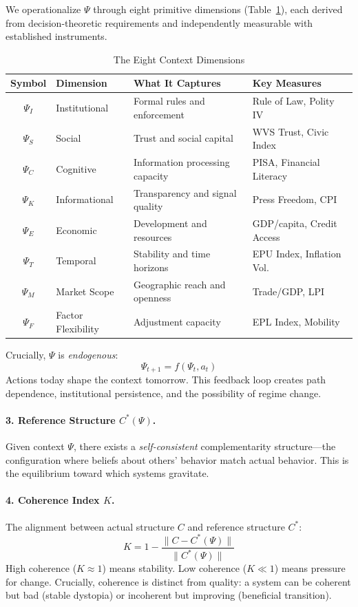 \documentclass[12pt,a4paper]{article}
\begin{document}
We operationalize $\Psi$ through eight primitive dimensions (Table~\ref{tab:psi-intro}), each derived from decision-theoretic requirements and independently measurable with established instruments.

\begin{table}[htbp]
\centering
\caption{The Eight Context Dimensions}
\label{tab:psi-intro}
\small
\begin{tabular}{@{}clll@{}}
\toprule
\textbf{Symbol} & \textbf{Dimension} & \textbf{What It Captures} & \textbf{Key Measures} \\
\midrule
$\Psi_I$ & Institutional & Formal rules and enforcement & Rule of Law, Polity IV \\
$\Psi_S$ & Social & Trust and social capital & WVS Trust, Civic Index \\
$\Psi_C$ & Cognitive & Information processing capacity & PISA, Financial Literacy \\
$\Psi_K$ & Informational & Transparency and signal quality & Press Freedom, CPI \\
$\Psi_E$ & Economic & Development and resources & GDP/capita, Credit Access \\
$\Psi_T$ & Temporal & Stability and time horizons & EPU Index, Inflation Vol. \\
$\Psi_M$ & Market Scope & Geographic reach and openness & Trade/GDP, LPI \\
$\Psi_F$ & Factor Flexibility & Adjustment capacity & EPL Index, Mobility \\
\bottomrule
\end{tabular}
\end{table}

Crucially, $\Psi$ is \emph{endogenous}:
\begin{equation}
  \Psi_{t+1} = f(\Psi_t, a_t)
\end{equation}
Actions today shape the context tomorrow. This feedback loop creates path dependence, institutional persistence, and the possibility of regime change.

\paragraph{3. Reference Structure $C^*(\Psi)$.}
Given context $\Psi$, there exists a \emph{self-consistent} complementarity structure---the configuration where beliefs about others' behavior match actual behavior. This is the equilibrium toward which systems gravitate.

\paragraph{4. Coherence Index $K$.}
The alignment between actual structure $C$ and reference structure $C^*$:
\begin{equation}
    K = 1 - \frac{\|C - C^*(\Psi)\|}{\|C^*(\Psi)\|}
\end{equation}
High coherence ($K \approx 1$) means stability. Low coherence ($K \ll 1$) means pressure for change. Crucially, coherence is distinct from quality: a system can be coherent but bad (stable dystopia) or incoherent but improving (beneficial transition).
\end{document}
